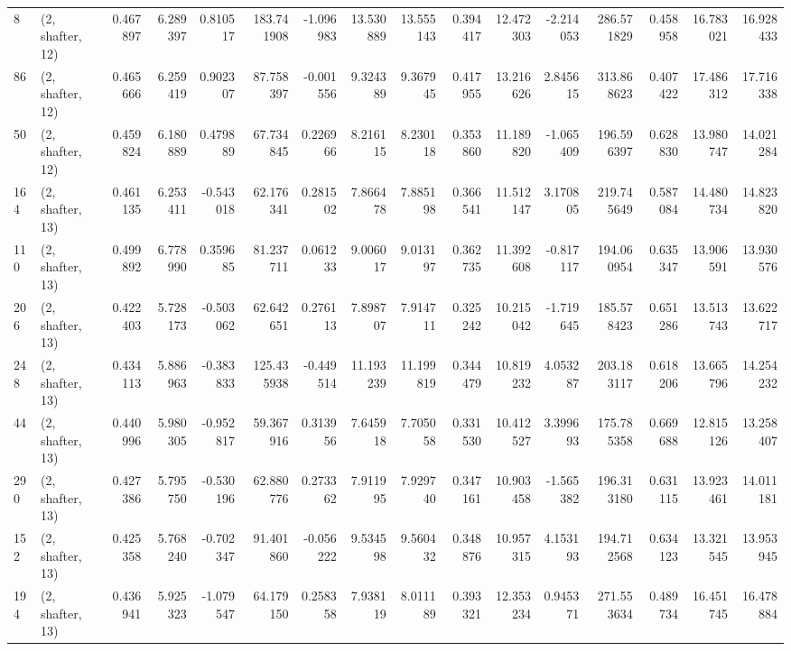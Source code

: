 \begin{tabular}{llrrrrrrrrrrrrrr}
8   &  (2, shafter, 12) &   0.467897 &   6.289397 &   0.810517 &   183.741908 &  -1.096983 &  13.530889 &  13.555143 &  0.394417 &  12.472303 &  -2.214053 &    286.571829 &    0.458958 &   16.783021 &   16.928433 \\
86  &  (2, shafter, 12) &   0.465666 &   6.259419 &   0.902307 &    87.758397 &  -0.001556 &   9.324389 &   9.367945 &  0.417955 &  13.216626 &   2.845615 &    313.868623 &    0.407422 &   17.486312 &   17.716338 \\
50  &  (2, shafter, 12) &   0.459824 &   6.180889 &   0.479889 &    67.734845 &   0.226966 &   8.216115 &   8.230118 &  0.353860 &  11.189820 &  -1.065409 &    196.596397 &    0.628830 &   13.980747 &   14.021284 \\
164 &  (2, shafter, 13) &   0.461135 &   6.253411 &  -0.543018 &    62.176341 &   0.281502 &   7.866478 &   7.885198 &  0.366541 &  11.512147 &   3.170805 &    219.745649 &    0.587084 &   14.480734 &   14.823820 \\
110 &  (2, shafter, 13) &   0.499892 &   6.778990 &   0.359685 &    81.237711 &   0.061233 &   9.006017 &   9.013197 &  0.362735 &  11.392608 &  -0.817117 &    194.060954 &    0.635347 &   13.906591 &   13.930576 \\
206 &  (2, shafter, 13) &   0.422403 &   5.728173 &  -0.503062 &    62.642651 &   0.276113 &   7.898707 &   7.914711 &  0.325242 &  10.215042 &  -1.719645 &    185.578423 &    0.651286 &   13.513743 &   13.622717 \\
248 &  (2, shafter, 13) &   0.434113 &   5.886963 &  -0.383833 &   125.435938 &  -0.449514 &  11.193239 &  11.199819 &  0.344479 &  10.819232 &   4.053287 &    203.183117 &    0.618206 &   13.665796 &   14.254232 \\
44  &  (2, shafter, 13) &   0.440996 &   5.980305 &  -0.952817 &    59.367916 &   0.313956 &   7.645918 &   7.705058 &  0.331530 &  10.412527 &   3.399693 &    175.785358 &    0.669688 &   12.815126 &   13.258407 \\
290 &  (2, shafter, 13) &   0.427386 &   5.795750 &  -0.530196 &    62.880776 &   0.273362 &   7.911995 &   7.929740 &  0.347161 &  10.903458 &  -1.565382 &    196.313180 &    0.631115 &   13.923461 &   14.011181 \\
152 &  (2, shafter, 13) &   0.425358 &   5.768240 &  -0.702347 &    91.401860 &  -0.056222 &   9.534598 &   9.560432 &  0.348876 &  10.957315 &   4.153193 &    194.712568 &    0.634123 &   13.321545 &   13.953945 \\
194 &  (2, shafter, 13) &   0.436941 &   5.925323 &  -1.079547 &    64.179150 &   0.258358 &   7.938119 &   8.011189 &  0.393321 &  12.353234 &   0.945371 &    271.553634 &    0.489734 &   16.451745 &   16.478884 \\

\end{tabular}
